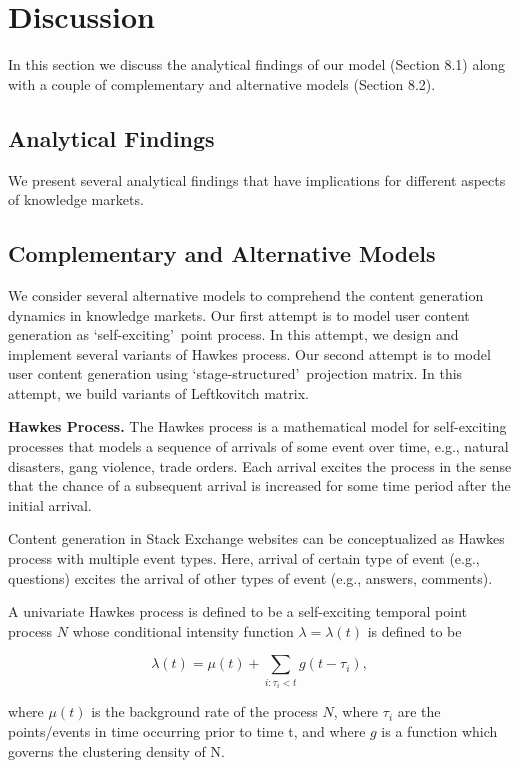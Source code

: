 \section{Discussion}
In this section we discuss the analytical findings of our model (Section 8.1) along with a couple of complementary and alternative models (Section 8.2).

\subsection{Analytical Findings}
We present several analytical findings that have implications for different aspects of knowledge markets.

\subsection{Complementary and Alternative Models}
We consider several alternative models to comprehend the content generation dynamics in knowledge markets. Our first attempt is to model user content generation as \lq self-exciting\rq\ point process. In this attempt, we design and implement several variants of Hawkes process. Our second attempt is to model user content generation using \lq stage-structured\rq\ projection matrix. In this attempt, we build variants of Leftkovitch matrix. 

\textbf{Hawkes Process.} The Hawkes process is a mathematical model for self-exciting processes that models a sequence of arrivals of some event over time, e.g., natural disasters, gang violence, trade orders.  Each arrival excites the process in the sense that the chance of a subsequent arrival is increased for some time period after the initial arrival. 

Content generation in Stack Exchange websites can be conceptualized as Hawkes process with multiple event types. Here, arrival of certain type of event (e.g., questions) excites the arrival of other types of event (e.g., answers, comments). 

A univariate Hawkes process is defined to be a self-exciting temporal point process $N$ whose conditional intensity function $\lambda = \lambda(t)$ is defined to be

 $$\lambda(t) = \mu(t)+\sum_{i:\tau_i<t}g(t-\tau_i),$$
 
where $\mu(t)$ is the background rate of the process  $N$, where $\tau_i$ are the points/events in time occurring prior to time t, and where $g$ is a function which governs the clustering density of N. 

